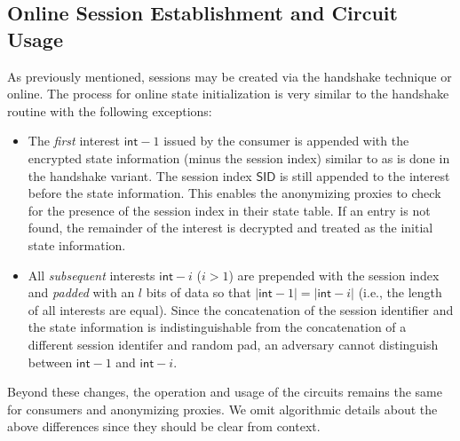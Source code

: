 \subsection{Online Session Establishment and Circuit Usage} \label{sec:piggyback}
As previously mentioned, sessions may be created via the handshake technique or online. The process for online state initialization is very similar to the handshake routine with the following exceptions:
\begin{itemize}
  \item The \emph{first} interest $\mathsf{int}-1$ issued by the consumer is appended with the encrypted state information (minus the session index) similar to as is done in the handshake variant. The session index $\mathsf{SID}$ is still appended to the interest before the state information. This enables the anonymizing proxies to check for the presence of the session index in their state table. If an entry is not found, the remainder of the interest is decrypted and treated as the initial state information.
  \item All \emph{subsequent} interests $\mathsf{int}-i$ ($i > 1$) are prepended with the session index and \emph{padded} with an $l$ bits of data so that $|\mathsf{int}-1| = |\mathsf{int}-i|$ (i.e., the length of all interests are equal). Since the concatenation of the session identifier and the state information is indistinguishable from the concatenation of a different session identifer and random pad, an adversary cannot distinguish between $\mathsf{int}-1$ and $\mathsf{int}-i$.
\end{itemize}
Beyond these changes, the operation and usage of the circuits remains the same for consumers and anonymizing proxies. We omit algorithmic details about the above differences since they should be clear from context.

